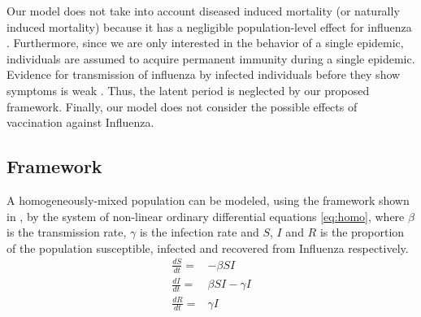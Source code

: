 \documentclass[a4paper, 12pt, journal]{ieeeconf}\usepackage[]{graphicx}\usepackage[]{color}
\begin{document}
Our model does not take into account diseased induced mortality (or naturally induced mortality) because it has a negligible population-level effect for influenza \cite{InfluenzaPeriod}.
Furthermore, since we are only interested in the behavior of a single epidemic, individuals are assumed to acquire permanent immunity during a single epidemic.
Evidence for transmission of influenza by infected individuals before they show symptoms is weak \cite{InfluenzaLatentPeriod}. Thus, the latent period is neglected by our proposed framework. Finally, our model does not consider the possible effects of vaccination against Influenza. 

\subsection{Framework}

A homogeneously-mixed population can be modeled, using the framework shown in , by the system of non-linear ordinary differential equations \eqref{eq:homo}, where $\beta$ is the transmission rate, $\gamma$ is the infection rate and $S$, $I$ and $R$ is the proportion of the population susceptible, infected and recovered from Influenza respectively. 
\begin{subequations}\label{eq:homo}
\begin{eqnarray}
\frac{dS}{dt} =& -\beta S I \label{eq:SIRdSdt}\\
\frac{dI}{dt} =& \beta S I - \gamma I \label{eq:SIRdIdt}\\
\frac{dR}{dt} =& \gamma I \label{eq:SIRdRdt}
\end{eqnarray}
\end{subequations}
\end{document}
